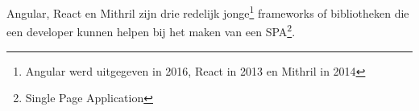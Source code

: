 
%
%

%



\chapter*{}

Angular, React en Mithril zijn drie redelijk jonge\footnote{Angular werd uitgegeven in 2016, React in 2013 en Mithril in 2014} frameworks of bibliotheken die een developer kunnen helpen bij het maken van een SPA\footnote{Single Page Application}. 

